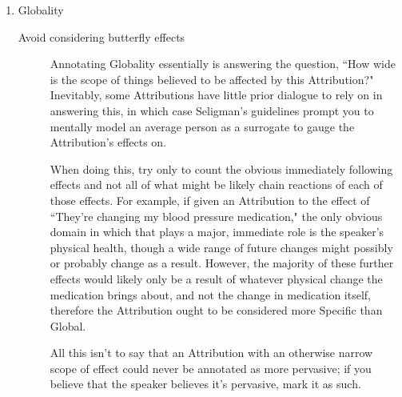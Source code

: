 \documentclass[a4paper,12pt]{article}
\begin{document}
\begin{enumerate}
\begin{description}
                
        \end{description}

    \item Globality
        \begin{description}
            \item[Avoid considering butterfly effects] Annotating Globality essentially is answering the question, ``How wide is the scope of things believed to be affected by this Attribution?" Inevitably, some Attributions have little prior dialogue to rely on in answering this, in which case Seligman's guidelines prompt you to mentally model an average person as a surrogate to gauge the Attribution's effects on.

                When doing this, try only to count the obvious immediately following effects and not all of what might be likely chain reactions of each of those effects. For example, if given an Attribution to the effect of ``They're changing my blood pressure medication," the only obvious domain in which that plays a major, immediate role is the speaker's physical health, though a wide range of future changes might possibly or probably change as a result. However, the majority of these further effects would likely only be a result of whatever physical change the medication brings about, and not the change in medication itself, therefore the Attribution ought to be considered more Specific than Global.

                All this isn't to say that an Attribution with an otherwise narrow scope of effect could never be annotated as more pervasive; if you believe that the speaker believes it's pervasive, mark it as such.
        \end{description}
    \end{enumerate}
\end{document}
